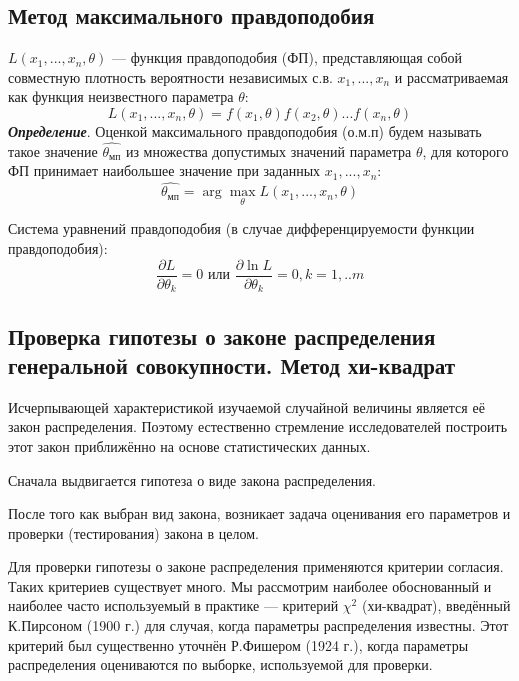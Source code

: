 \documentclass[a4paper]{article}
\begin{document}
\subsection{Метод максимального правдоподобия}
\noindent $L(x_{1},... ,x_{n}, \theta)$ — функция правдоподобия (ФП), представляющая собой совместную плотность вероятности независимых с.в. $x_{1}, ... ,x_{n}$ и рассматриваемая как функция неизвестного параметра $\theta$:
\begin{equation}
L(x_{1},...,x_{n},\theta) = f(x_{1},\theta)f(x_{2},\theta)...f(x_{n}, \theta)
\label{L()}
\end{equation}
\textbf{\textit{Определение}}. Оценкой максимального правдоподобия (о.м.п) будем называть такое значение $\hat{\theta_{мп}}$ из множества допустимых значений параметра $\theta$, для которого ФП принимает наибольшее значение при заданных $x_{1},...,x_{n}$:
\begin{equation}
\hat{\theta_{мп}} = \arg \max_{\theta}L(x_{1},...,x_{n},\theta)
\label{theta_mp}
\end{equation}

Система уравнений правдоподобия (в случае дифференцируемости функции правдоподобия):
\begin{equation}
\frac{\partial L}{\partial \theta_{k}} = 0 \text{  или  } \frac{\partial \ln L}{\partial \theta_{k}} = 0, k = 1,..m
\end{equation}

\subsection{Проверка гипотезы о законе распределения генеральной совокупности. Метод хи-квадрат}
\noindent Исчерпывающей характеристикой изучаемой случайной величины является её закон распределения. Поэтому естественно стремление исследователей построить этот закон приближённо на основе статистических данных.

Сначала выдвигается гипотеза о виде закона распределения.

После того как выбран вид закона, возникает задача оценивания его параметров и проверки (тестирования) закона в целом.

Для проверки гипотезы о законе распределения применяются критерии согласия. Таких критериев существует много. Мы рассмотрим наиболее обоснованный и наиболее часто используемый в практике — критерий $\chi^{2}$ (хи-квадрат), введённый К.Пирсоном (1900 г.) для случая, когда параметры распределения известны. Этот критерий был существенно уточнён Р.Фишером (1924 г.), когда параметры распределения оцениваются по выборке, используемой для проверки.
\end{document}
